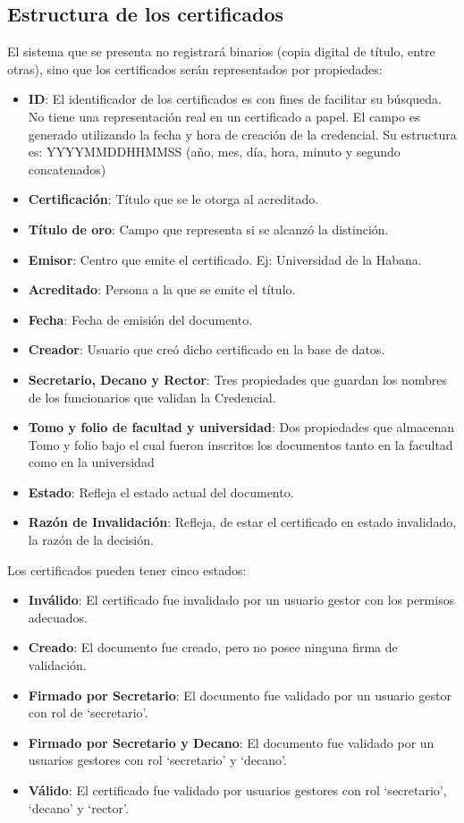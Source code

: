 \subsection{Estructura de los certificados}
El sistema que se presenta no registrará binarios (copia digital de título, entre otras), sino que los certificados serán representados por propiedades:
\begin{itemize}
	\item \textbf{ID}: El identificador de los certificados es con fines de facilitar su búsqueda. No tiene una representación real en un certificado a papel. El campo es generado utilizando la fecha y hora de creación de la credencial. Su estructura es: YYYYMMDDHHMMSS (año, mes, día, hora, minuto y segundo concatenados)
	\item \textbf{Certificación}: Título que se le otorga al acreditado.
	\item \textbf{Título de oro}: Campo que representa si se alcanzó la distinción.
	\item \textbf{Emisor}: Centro que emite el certificado. Ej: Universidad de la Habana.
	\item \textbf{Acreditado}: Persona a la que se emite el título.
	\item \textbf{Fecha}: Fecha de emisión del documento.
	\item \textbf{Creador}: Usuario que creó dicho certificado en la base de datos.
	\item \textbf{Secretario, Decano y Rector}: Tres propiedades que guardan los nombres de los funcionarios que validan la Credencial.
	\item \textbf{Tomo y folio de facultad y universidad}: Dos propiedades que almacenan Tomo y folio bajo el cual fueron inscritos los documentos tanto en la facultad como en la universidad
	\item \textbf{Estado}: Refleja el estado actual del documento.
	\item \textbf{Razón de Invalidación}: Refleja, de estar el certificado en estado invalidado, la razón de la decisión.
\end{itemize}

Los certificados pueden tener cinco estados:
\begin{itemize}
	\item \textbf{Inválido}: El certificado fue invalidado por un usuario gestor con los permisos adecuados.
	\item \textbf{Creado}: El documento fue creado, pero no posee ninguna firma de validación.
	\item \textbf{Firmado por Secretario}: El documento fue validado por un usuario gestor con rol de `secretario'.
	\item \textbf{Firmado por Secretario y Decano}: El documento fue validado por un usuarios gestores con rol `secretario' y `decano'.
	\item \textbf{Válido}: El certificado fue validado por usuarios gestores con rol `secretario', `decano' y `rector'.
\end{itemize}

